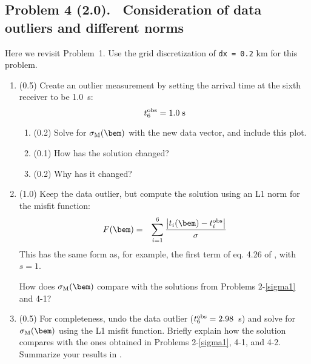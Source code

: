 \documentclass[11pt,titlepage,fleqn]{article}
\begin{document}

\pagebreak
\subsection*{Problem 4 (2.0). \ptag\ Consideration of data outliers and different norms}

Here we revisit Problem~1. Use the grid discretization of \verb+dx = 0.2+ km for this problem.

\begin{enumerate}
\item (0.5) Create an outlier measurement by setting the arrival time at the sixth receiver to be 1.0~s:
%
\begin{equation}
t_6^{\rm obs} = 1.0\;{\rm s}
\end{equation}

\begin{enumerate}
\item (0.2) Solve for $\sigma_{\rm M}(\bem)$ with the new data vector, and include this plot.
\item (0.1) How has the solution changed?
\item (0.2) Why has it changed?
\end{enumerate}

\item (1.0) Keep the data outlier, but compute the solution using an L1 norm for the misfit function:
%
\begin{eqnarray}
F(\bem) &=& \sum_{i=1}^6 \frac{\left| t_i(\bem) - t_i^{\rm obs}\right|}{\sigma}
\end{eqnarray}
%
This has the same form as, for example, the first term of eq. 4.26 of \citet{Tarantola2005}, with $s=1$.

How does $\sigma_{\rm M}(\bem)$ compare with the solutions from Problems 2-\ref{sigma1} and 4-1?

\item (0.5) For completeness, undo the data outlier ($t_6^{\rm obs} = 2.98$~s) and solve for $\sigma_{\rm M}(\bem)$ using the L1 misfit function.
Briefly explain how the solution compares with the ones obtained in Problems 2-\ref{sigma1}, 4-1, and 4-2.
Summarize your results in .

\end{enumerate}
\end{document}
